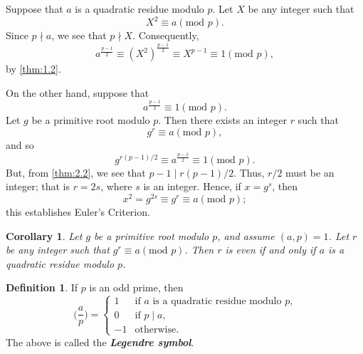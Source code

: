 \documentclass{article}
\makeatletter
\newtheorem{corollary}{Corollary}[section]
\theoremstyle{definition}
\newtheorem{definition}{Definition}[section]
\theoremstyle{remark}
\let\oldproofname=\proofname
\renewcommand{\proofname}{\textit{\oldproofname}}
\theoremstyle{definition}
\renewenvironment{proof}[1][\proofname]{\par
  \pushQED{\qed}%
  \normalfont \topsep6\p@\@plus6\p@\relax
  \list{}{\leftmargin=0mm
          \rightmargin=0mm
          \settowidth{\itemindent}{\itshape#1}%
          \labelwidth=\itemindent
          \parsep=0pt \listparindent=0mm%
  }
  \item[\hskip\labelsep
        \itshape
    #1\@addpunct{.}]\ignorespaces
}{%
  \popQED\endlist\@endpefalse
}
\makeatother
\begin{document}
        \begin{proof}
            Suppose that $a$ is a quadratic residue modulo $p$. Let $X$ be any integer such that 
                \begin{equation*}
                    X^2\equiv a(\text{mod }p).
                \end{equation*}
            Since $p\nmid a$, we see that $p\nmid X$. Consequently,
                \begin{equation*}
                    a^{\frac{p-1}{2}}\equiv (X^2)^{\frac{p-1}{2}}\equiv X^{p-1}\equiv 1(\text{mod }p),
                \end{equation*}
            by \cref{thm:1.2}.\par\hspace{4mm} On the other hand, suppose that
                \begin{equation*}
                    a^{\frac{p-1}{2}}\equiv 1(\text{mod }p).
                \end{equation*}
            Let $g$ be a primitive root modulo $p$. Then there exists an integer $r$ such that
                \begin{equation*}
                    g^r\equiv a(\text{mod }p), 
                \end{equation*}
            and so 
                \begin{equation*}
                    g^{r(p-1)/2}\equiv a^{\frac{p-1}{2}}\equiv 1(\text{mod }p).
                \end{equation*}
            But, from \cref{thm:2.2}, we see that $p-1\mid r(p-1)/2$. Thus, $r/2$ must be an integer; that is $r=2s$, where $s$ is an integer. Hence, if $x=g^s$, then 
                \begin{equation*}
                    x^2=g^{2s}\equiv g^r\equiv a(\text{mod }p);
                \end{equation*}
            this establishes Euler's Criterion.
        \end{proof}
    \begin{corollary}\label{cor:4.1}
        Let $g$ be a primitive root modulo $p$, and assume $(a,p)=1$. Let $r$ be any integer such that $g^r\equiv a(\text{mod }p)$. Then $r$ is even if and only if $a$ is a quadratic residue modulo $p$.
    \end{corollary}
    \begin{definition}\label{def:4.2}
        If $p$ is an odd prime, then 
            \begin{equation*}
                \bigg(\frac{a}{p}\bigg)=\begin{cases} 1 & \text{if $a$ is a quadratic residue modulo $p$,} \\ 0 & \text{if } p\mid a, \\ -1 & \text{otherwise}.\end{cases}
            \end{equation*}
        The above is called the \textbf{\textit{Legendre symbol}}.
    \end{definition}
\end{document}
